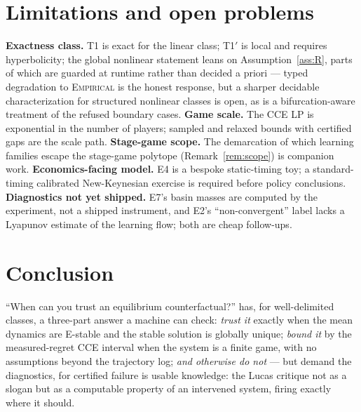 \documentclass[pmlr]{jmlr}
\newcommand{\Cem}{\textsc{Empirical}}
\begin{document}
\section{Limitations and open problems}\label{sec:limitations}

 \textbf{Exactness class.} T1 is exact for the linear class; T1$'$ is local and
requires hyperbolicity; the global nonlinear statement leans on Assumption~\ref{ass:R}, parts
of which are guarded at runtime rather than decided a priori --- typed degradation to \Cem{} is
the honest response, but a sharper decidable characterization for structured nonlinear classes
is open, as is a bifurcation-aware treatment of the refused boundary cases. \textbf{Game scale.} The CCE LP is exponential in the number of players;
sampled and relaxed bounds with certified gaps are the scale path. \textbf{Stage-game scope.}
The demarcation of which learning families escape the stage-game polytope
(Remark~\ref{rem:scope}) is companion work. \textbf{Economics-facing model.} E4 is a bespoke
static-timing toy; a standard-timing calibrated New-Keynesian exercise is required before policy
conclusions. \textbf{Diagnostics not yet shipped.} E7's basin masses are computed by the
experiment, not a shipped instrument, and E2's ``non-convergent'' label lacks a Lyapunov
estimate of the learning flow; both are cheap follow-ups.

\section{Conclusion}\label{sec:conclusion}

 ``When can you trust an equilibrium counterfactual?'' has, for well-delimited
classes, a three-part answer a machine can check: \emph{trust it} exactly when the mean dynamics are
E-stable and the stable solution is globally unique; \emph{bound it} by the measured-regret CCE
interval when the system is a finite game, with no assumptions beyond the trajectory log;
\emph{and otherwise do not} --- but demand the diagnostics, for certified failure is usable
knowledge: the Lucas critique not as a slogan but as a computable property of an intervened
system, firing exactly where it should.


\end{document}
